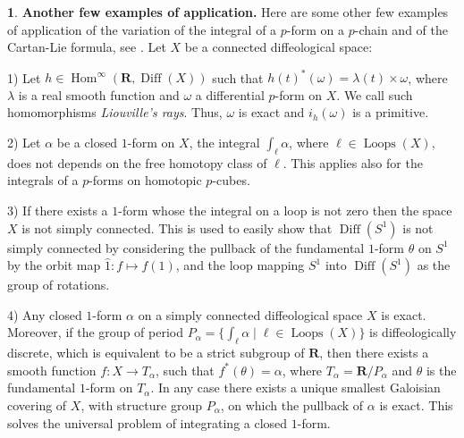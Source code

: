 \documentclass[11pt,reqno]{amsart}
\theoremstyle{definition}
\newtheorem{article}{}
\newcommand{\artlabel}[1]{{\bf #1.}}
\newcommand{\RR}{{\mathbf R}}
\def \P{{P}}
\def \S{{S}}
\def \T{{T}}
\def \X{{X}}
\newcommand{\Loops}{\operatorname{Loops}}
\newcommand{\Diff}{\operatorname{Diff}}
\newcommand{\Hom}{\operatorname{Hom}}
\begin{document}
  \begin{article}\artlabel{Another few examples of application}
  \label{A-few-examples-of-application}
    Here are some other few examples of application of the variation of
    the integral of a $p$-form on a $p$-chain and of the
    Cartan-Lie formula, see \cite{Piz05}. 
    Let $\X$ be a connected diffeological space:
    
      1) Let $h \in \Hom^\infty(\RR,\Diff(\X))$ such that
      $h(t)^*(\omega) = \lambda(t) \times \omega$, where
      $\lambda$ is a real smooth function and $\omega$ a
      differential $p$-form on $\X$. We call such homomorphisms
      {\em Liouville's rays}. Thus, $\omega$ is exact and
      $i_h(\omega)$ is a primitive.
      
      2) Let $\alpha$ be a closed
      $1$-form on $\X$, the integral $\displaystyle \int_\ell
        \alpha$, where $\ell \in \Loops(\X)$, does not depends on
      the free homotopy class of $\ell$. This applies also for
      the integrals of a $p$-forms on homotopic $p$-cubes.
      
      3) If there exists a $1$-form whose the integral on a
      loop is not zero then the space $\X$ is not simply
      connected. This is used to easily show that
      $\Diff(\S^1)$ is not simply connected by considering the
      pullback of the fundamental $1$-form $\theta$ on $\S^1$ by
      the orbit map $\hat 1 : f \mapsto f(1)$, and the loop
      mapping $\S^1$ into $\Diff(\S^1)$ as the group of
      rotations.
      
      4) Any closed $1$-form $\alpha$ on a simply connected
      diffeological space $\X$ is exact. Moreover, if the group
      of period $\P_\alpha = \{ \int_\ell \alpha \mid \ell
        \in \Loops(\X)\}$ is diffeologically discrete, which is equivalent to be a strict subgroup of $\RR$, then there
      exists a smooth function $f : \X \to \T_\alpha$, such
      that $f^*(\theta) = \alpha$, where $\T_\alpha =
        \RR/\P_{\!\!\alpha}$ and $\theta$ is the fundamental
      $1$-form on $\T_\alpha$. In any case there exists a unique smallest Galoisian covering of $\X$,
      with structure group $\P_\alpha$, on which the pullback of $\alpha$ is exact. This solves
      the universal problem of integrating a closed $1$-form. 
      

\end{article}
\end{document}
